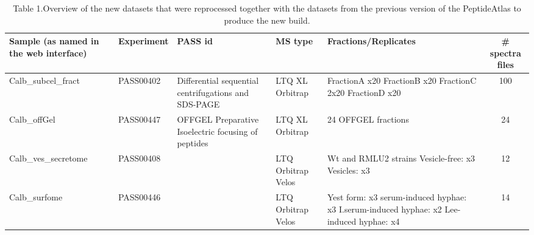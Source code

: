 \begin{table}[t]

\renewcommand{\arraystretch}{1.5}
\caption*{Table 1.Overview of the new datasets that were reprocessed together with the datasets from the previous version of the PeptideAtlas to produce the
new build.}
\footnotesize
\centering
\begin{tabular}{p{2cm} p{1cm} p{2cm} p{1cm} p{2cm} c }
\hline
{\scriptsize Sample \newline (as named in \newline the web interface)} & {\scriptsize Experiment } & {\scriptsize PASS id } & {\scriptsize MS type } & {\scriptsize Fractions/Replicates } & {\scriptsize \# spectra files}\\
\hline
{\scriptsize Calb\_subcel\_fract} & {\scriptsize PASS00402} & {\scriptsize Differential \newline sequential \newline centrifugations \newline and \newline SDS-PAGE } & {\scriptsize LTQ XL  \newline Orbitrap } & {\scriptsize FractionA x20 \newline FractionB x20 \newline FractionC 2x20  \newline FractionD x20  } & 100 \\ 
{\scriptsize Calb\_offGel} & {\scriptsize PASS00447 } & {\scriptsize OFFGEL \newline Preparative \newline Isoelectric \newline focusing \newline of peptides } &  {\scriptsize LTQ XL \newline Orbitrap } & {\scriptsize 24 OFFGEL fractions} & 24\\
{\scriptsize Calb\_ves\_secretome} & {\scriptsize PASS00408} & {\scriptsize \citep{Gil-Bona2015a} } &  {\scriptsize LTQ \newline Orbitrap \newline Velos } & {\scriptsize Wt and RMLU2 strains \newline Vesicle-free: x3 \newline Vesicles: x3 } & 12\\
{\scriptsize Calb\_surfome} & {\scriptsize PASS00446} & {\scriptsize \citep{Gil-Bona2015} } & {\scriptsize LTQ \newline Orbitrap \newline Velos } & {\scriptsize Yest form: x3 \newline serum-induced hyphae: x3 \newline I.serum-induced hyphae: x2 \newline Lee-induced hyphae: x4 } & 14\\

\end{tabular}

\end{table}


